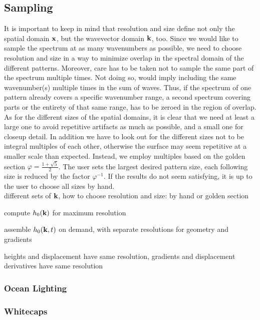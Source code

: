 \subsection{Sampling}
%
It is important to keep in mind that resolution and size define not only the
spatial domain $\mathbf{x}$, but the wavevector domain $\mathbf{k}$, too. Since we
would like to sample the spectrum at as many wavenumbers as possible, we need to
choose resolution and size in a way to minimize overlap in the spectral domain
of the different patterns. Moreover, care has to be taken not to sample the same
part of the spectrum multiple times. Not doing so, would imply including the
same wavenumber(s) multiple times in the sum of waves. Thus, if the spectrum
of one pattern already covers a specific wavenumber range, a second spectrum
covering parts or the entirety of that same range, has to be zeroed in the
region of overlap. As for the different sizes of the spatial domains, it is
clear that we need at least a large one to avoid repetitive artifacts as much as
possible, and a small one for closeup detail. In addition we have to look out
for the different sizes not to be integral multiples of each other, otherwise
the surface may seem repetitive at a smaller scale than expected. Instead, we
employ multiples based on the golden section $\varphi = \frac{1 + \sqrt{5}}{2}$.
The user sets the largest desired pattern size, each following size is reduced
by the factor $\varphi^{-1}$. If the results do not seem satisfying, it is up to
the user to choose all sizes by hand.\\




different sets of $\mathbf{k}$, how to choose resolution and size: by hand or 
golden section


compute $h_0(\mathbf{k})$ for maximum resolution


assemble $h_0(\mathbf{k},t)$ on demand, with separate resolutions for geometry 
and gradients

heights and displacement have same resolution, gradients and displacement 
derivatives have same resolution

\subsubsection{Ocean Lighting}
\cite{article:oceanlighting}
\subsubsection{Whitecaps}
\cite{article:whitecaps}